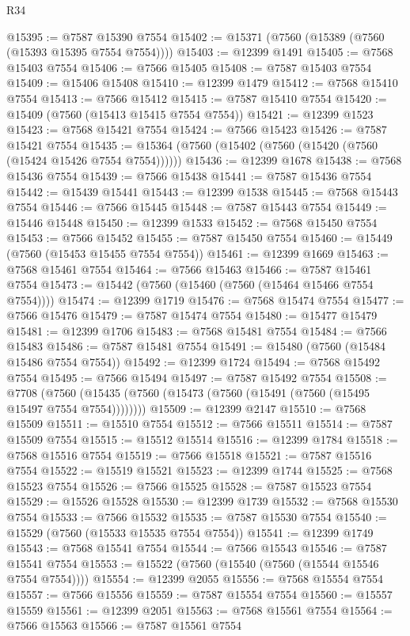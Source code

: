 \begin{lexlean}{R34}
\begin{coremodule}
@15395 := @7587 @15390 @7554
@15402 := @15371 (@7560 (@15389 (@7560 (@15393 @15395 @7554 @7554))))
@15403 := @12399 @1491
@15405 := @7568 @15403 @7554
@15406 := @7566 @15405
@15408 := @7587 @15403 @7554
@15409 := @15406 @15408
@15410 := @12399 @1479
@15412 := @7568 @15410 @7554
@15413 := @7566 @15412
@15415 := @7587 @15410 @7554
@15420 := @15409 (@7560 (@15413 @15415 @7554 @7554))
@15421 := @12399 @1523
@15423 := @7568 @15421 @7554
@15424 := @7566 @15423
@15426 := @7587 @15421 @7554
@15435 := @15364 (@7560 (@15402 (@7560 (@15420 (@7560 (@15424 @15426 @7554 @7554))))))
@15436 := @12399 @1678
@15438 := @7568 @15436 @7554
@15439 := @7566 @15438
@15441 := @7587 @15436 @7554
@15442 := @15439 @15441
@15443 := @12399 @1538
@15445 := @7568 @15443 @7554
@15446 := @7566 @15445
@15448 := @7587 @15443 @7554
@15449 := @15446 @15448
@15450 := @12399 @1533
@15452 := @7568 @15450 @7554
@15453 := @7566 @15452
@15455 := @7587 @15450 @7554
@15460 := @15449 (@7560 (@15453 @15455 @7554 @7554))
@15461 := @12399 @1669
@15463 := @7568 @15461 @7554
@15464 := @7566 @15463
@15466 := @7587 @15461 @7554
@15473 := @15442 (@7560 (@15460 (@7560 (@15464 @15466 @7554 @7554))))
@15474 := @12399 @1719
@15476 := @7568 @15474 @7554
@15477 := @7566 @15476
@15479 := @7587 @15474 @7554
@15480 := @15477 @15479
@15481 := @12399 @1706
@15483 := @7568 @15481 @7554
@15484 := @7566 @15483
@15486 := @7587 @15481 @7554
@15491 := @15480 (@7560 (@15484 @15486 @7554 @7554))
@15492 := @12399 @1724
@15494 := @7568 @15492 @7554
@15495 := @7566 @15494
@15497 := @7587 @15492 @7554
@15508 := @7708
    (@7560 (@15435 (@7560 (@15473 (@7560 (@15491 (@7560 (@15495 @15497 @7554 @7554))))))))
@15509 := @12399 @2147
@15510 := @7568 @15509
@15511 := @15510 @7554
@15512 := @7566 @15511
@15514 := @7587 @15509 @7554
@15515 := @15512 @15514
@15516 := @12399 @1784
@15518 := @7568 @15516 @7554
@15519 := @7566 @15518
@15521 := @7587 @15516 @7554
@15522 := @15519 @15521
@15523 := @12399 @1744
@15525 := @7568 @15523 @7554
@15526 := @7566 @15525
@15528 := @7587 @15523 @7554
@15529 := @15526 @15528
@15530 := @12399 @1739
@15532 := @7568 @15530 @7554
@15533 := @7566 @15532
@15535 := @7587 @15530 @7554
@15540 := @15529 (@7560 (@15533 @15535 @7554 @7554))
@15541 := @12399 @1749
@15543 := @7568 @15541 @7554
@15544 := @7566 @15543
@15546 := @7587 @15541 @7554
@15553 := @15522 (@7560 (@15540 (@7560 (@15544 @15546 @7554 @7554))))
@15554 := @12399 @2055
@15556 := @7568 @15554 @7554
@15557 := @7566 @15556
@15559 := @7587 @15554 @7554
@15560 := @15557 @15559
@15561 := @12399 @2051
@15563 := @7568 @15561 @7554
@15564 := @7566 @15563
@15566 := @7587 @15561 @7554

\end{coremodule}
\end{lexlean}
